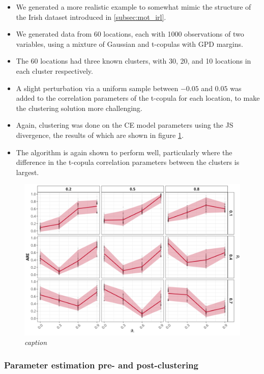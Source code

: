 \documentclass{article}
\numberwithin{equation}{section}
\begin{document}
\begin{itemize}
  \item We generated a more realistic example to somewhat mimic the structure of the Irish dataset introduced in \ref{subsec:mot_irl}.
  \item We generated data from 60 locations, each with 1000 observations of two variables, using a mixture of Gaussian and t-copulas with GPD margins.
  \item The 60 locations had three known clusters, with 30, 20, and 10 locations in each cluster respectively.
  \item A slight perturbation via a uniform sample between $-0.05$ and $0.05$ was added to the correlation parameters of the t-copula for each location, to make the clustering solution more challenging.
  \item Again, clustering was done on the CE model parameters using the JS divergence, the results of which are shown in figure \ref{fig:03_realistic}.
  \item The algorithm is again shown to perform well, particularly where the difference in the t-copula correlation parameters between the clusters is largest. 
\end{itemize}

\begin{figure}[H]
    \centering
    \includegraphics[width = 0.9\linewidth]{plots/sim_01d_js_sens_3_var_dqu_0.9.png}
    \caption{\emph{caption}}
    \label{fig:03_realistic}
\end{figure}

\subsubsection{Parameter estimation pre- and post-clustering} \label{subsubsec:sim_refit}
\end{document}
